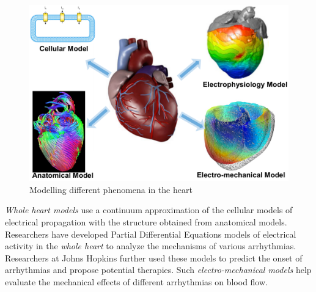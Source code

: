 \begin{figure}[t]
		\centering
		\includegraphics[width=\textwidth]{figs/fig2models.pdf}
		\caption{\small Modelling different phenomena in the heart}
		\label{fig:models}
\end{figure}

\emph{Whole heart models} use a continuum approximation of the cellular models of electrical propagation with the structure obtained from anatomical models. Researchers have developed Partial Differential Equations models of electrical activity in the \emph{whole heart} to analyze the mechanisms of various arrhythmias. 
Researchers at Johns Hopkins \cite{TrayanovaB14_Advances} further used these models to predict the onset of arrhythmias and propose potential therapies. 
Such \emph{electro-mechanical models} help evaluate the mechanical effects of different arrhythmias on blood flow.

